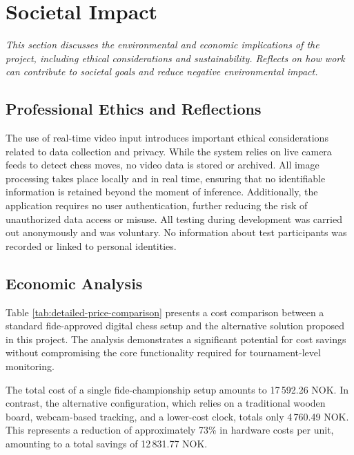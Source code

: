 \chapter{Societal Impact}

\begin{center}
    \textit{This section discusses the environmental and economic implications of the project, including ethical considerations and sustainability. Reflects on how work can contribute to societal goals and reduce negative environmental impact.}
\end{center}

\section{Professional Ethics and Reflections}
The use of real-time video input introduces important ethical considerations related to data collection and privacy. While the system relies on live camera feeds to detect chess moves, no video data is stored or archived. All image processing takes place locally and in real time, ensuring that no identifiable information is retained beyond the moment of inference. Additionally, the application requires no user authentication, further reducing the risk of unauthorized data access or misuse. All testing during development was carried out anonymously and was voluntary. No information about test participants was recorded or linked to personal identities.  \\

\section{Economic Analysis}
Table \ref{tab:detailed-price-comparison} presents a cost comparison between a standard \gls{fide}-approved digital chess setup and the alternative solution proposed in this project. The analysis demonstrates a significant potential for cost savings without compromising the core functionality required for tournament-level monitoring. \\

\newpage

The total cost of a single \gls{fide}-championship setup amounts to 17\,592.26 NOK. In contrast, the alternative configuration, which relies on a traditional wooden board, webcam-based tracking, and a lower-cost clock, totals only 4\,760.49 NOK. This represents a reduction of approximately 73\% in hardware costs per unit, amounting to a total savings of 12\,831.77 NOK. \\

